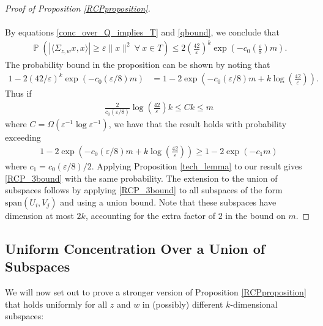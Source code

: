 \documentclass[11pt]{article}
\renewcommand{\epsilon}{\varepsilon}
\newcommand{\Pro}{\operatorname{\mathbb{P}}}
\theoremstyle{remark}
\begin{document}
\begin{proof}[Proof of Proposition \ref{RCPproposition}]
\paragraph{} By equations \eqref{conc_over_Q_implies_T} and \eqref{qbound}, we conclude that \begin{align*}
\Pro\left(|\langle \Sigma_{z,w} x,x \rangle| \geqslant \epsilon \|x\|^2\ \forall\ x \in T\right) \leqslant 2 \left(\frac{42}{\epsilon}\right)^k\exp\left(-c_0\left(\frac{\epsilon}{8}\right)m\right).
\end{align*}  The probability bound in the proposition can be shown by noting that \begin{align*}
    1 - 2(42/\epsilon)^k\exp(-c_0(\epsilon/8)m) & = 1 - 2\exp\left(-c_0(\epsilon/8) m + k\log\left(\frac{42}{\epsilon}\right)\right).
\end{align*} Thus if \begin{align*}
    \frac{2}{c_0(\epsilon/8)}\log\left(\frac{42}{\epsilon}\right) k \leqslant Ck\leqslant m
\end{align*} where $C = \Omega(\epsilon^{-1}\log\epsilon^{-1})$, we have that the result holds with probability exceeding \begin{align*}
    1-2\exp\left(-c_0(\epsilon/8) m + k\log\left(\frac{42}{\epsilon}\right)\right) \geqslant 1 - 2\exp(-c_1 m)
\end{align*} where $c_1 = c_0(\epsilon/8)/2$. Applying Proposition \ref{tech_lemma} to our result gives \eqref{RCP_3bound} with the same probability. The extension to the union of subspaces follows by applying \eqref{RCP_3bound} to all subspaces of the form $\text{span}(U_i,V_j)$ and using a union bound. Note that these subspaces have dimension at most $2k$, accounting for the extra factor of $2$ in the bound on $m$.

\end{proof}

\subsection{Uniform Concentration Over a Union of Subspaces}

We will now set out to prove a stronger version of Proposition \ref{RCPproposition} that holds uniformly for all $z$ and $w$ in (possibly) different $k$-dimensional subspaces:
\end{document}
